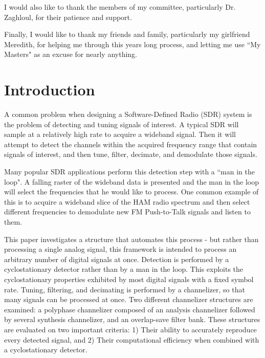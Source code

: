 \documentclass[12pt]{report}
\begin{document}
I would also like to thank the members of my committee, particularly Dr.
Zaghloul, for their patience and support.

Finally, I would like to thank my friends and family, particularly my girlfriend
Meredith, for helping me through this years long process, and letting me use
``My Masters" as an excuse for nearly anything.

\tableofcontents
\pagebreak

\listoffigures
\pagebreak


\pagestyle{myheadings}

\chapter{Introduction}
\label{sec:intro}

A common problem when designing a Software-Defined Radio (SDR) system is the
problem of detecting and tuning signals of interest. A typical SDR will sample
at a relatively high rate to acquire a wideband signal. Then it will attempt to
detect the channels within the acquired frequency range that contain signals of
interest, and then tune, filter, decimate, and demodulate those signals. 

Many popular SDR applications perform this detection step with
a ``man in the loop".  A falling raster of the wideband data is presented and
the man in the loop will select  the frequencies that he would like to process.
One common example of this is to acquire a wideband slice of the HAM radio
spectrum and then select different frequencies to demodulate new FM
Push-to-Talk signals and listen to them.

This paper investigates a structure that automates this process - but rather
than processing a single analog signal, this framework is intended to process
an arbitrary number of digital signals at once. Detection is performed by
a cyclostationary detector rather than by a man in the loop. This exploits the
cyclostationary properties exhibited by most digital signals with a fixed
symbol rate.  Tuning, filtering, and decimating is performed by a channelizer,
so that many signals can be processed at once.  Two different channelizer
structures are examined: a polyphase channelizer composed of an analysis
channelizer followed by several synthesis channelizer, and an overlap-save
filter bank. These structures are evaluated on two important criteria:
1) Their ability to accurately reproduce every detected signal, and 2) Their
computational efficiency when combined with a cyclostationary detector.
\end{document}
